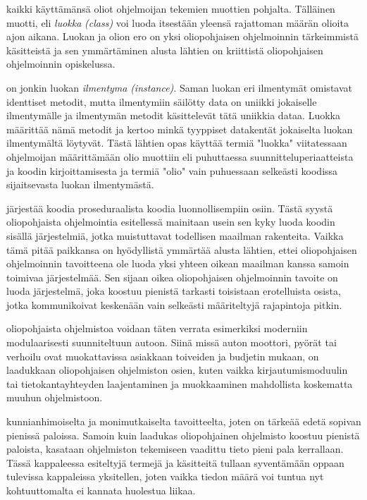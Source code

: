 \documentclass[a4paper,justified,notoc]{tufte-book}
\newcommand{\eng}[1]{\textit{(#1)}}
\newcommand{\new}[1]{\textit{\gls{#1}}}
\newcommand{\neweng}[2]{\new{#1} \eng{#2}}
\begin{document}
\begin{fullwidth}
 kaikki käyttämänsä oliot ohjelmoijan tekemien muottien pohjalta.
Tälläinen muotti, eli \neweng{luokka}{class} voi luoda itsestään yleensä rajattoman määrän olioita
ajon aikana. Luokan ja olion ero on yksi oliopohjaisen ohjelmoinnin tärkeimmistä käsitteistä ja
sen ymmärtäminen alusta lähtien on kriittistä oliopohjaisen ohjelmoinnin opiskelussa.

 on jonkin luokan \neweng{ilmentyma}{instance}. Saman luokan eri
ilmentymät omistavat identtiset metodit, mutta ilmentymiin säilötty data on uniikki jokaiselle
ilmentymälle ja ilmentymän metodit käsittelevät tätä uniikkia dataa. Luokka määrittää nämä metodit
ja kertoo minkä tyyppiset datakentät jokaiselta luokan ilmentymältä löytyvät. Tästä lähtien
opas käyttää termiä "luokka" viitatessaan ohjelmoijan määrittämään olio muottiin eli puhuttaessa
suunnitteluperiaatteista ja koodin kirjoittamisesta ja termiä "olio" vain puhuessaan selkeästi
koodissa sijaitsevasta luokan ilmentymästä.

 järjestää koodia proseduraalista koodia luonnollisempiin osiin.
Tästä syystä oliopohjaista ohjelmointia esitellessä mainitaan usein sen kyky luoda koodin sisällä
järjestelmiä, jotka muistuttavat todellisen maailman rakenteita. Vaikka tämä pitää paikkansa on
hyödyllistä ymmärtää alusta lähtien, ettei oliopohjaisen ohjelmoinnin tavoitteena ole luoda yksi
yhteen oikean maailman kanssa samoin toimivaa järjestelmää. Sen sijaan oikea oliopohjaisen
ohjelmoinnin tavoite on luoda järjestelmä, joka koostuu pienistä tarkasti toisistaan erotelluista
osista, jotka kommunikoivat keskenään vain selkeästi määriteltyjä rajapintoja pitkin.

 oliopohjaista ohjelmistoa voidaan täten verrata esimerkiksi
moderniin modulaarisesti suunniteltuun autoon. Siinä missä auton moottori, pyörät tai verhoilu
ovat muokattavissa asiakkaan toiveiden ja budjetin mukaan, on laadukkaan oliopohjaisen ohjelmiston
osien, kuten vaikka kirjautumismoduulin tai tietokantayhteyden laajentaminen ja muokkaaminen
mahdollista koskematta muuhun ohjelmistoon.

 kunnianhimoiselta ja monimutkaiselta tavoitteelta, joten on tärkeää
edetä sopivan pienissä paloissa. Samoin kuin laadukas oliopohjainen ohjelmisto koostuu pienistä
paloista, kasataan ohjelmiston tekemiseen vaadittu tieto pieni pala kerrallaan. Tässä kappaleessa
esiteltyjä termejä ja käsitteitä tullaan syventämään oppaan tulevissa kappaleissa yksitellen,
joten vaikka tiedon määrä voi tuntua nyt kohtuuttomalta ei kannata huolestua liikaa.


\end{fullwidth}
\end{document}
